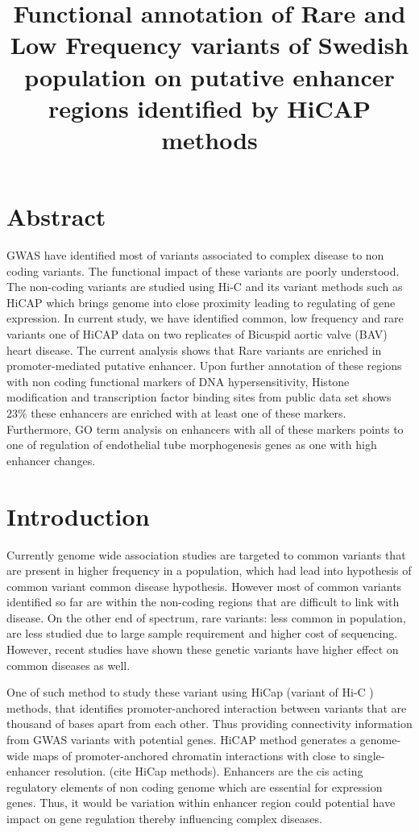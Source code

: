 \documentclass[11pt]{article} %
\title{Functional annotation of Rare and Low Frequency variants of Swedish population on putative enhancer regions identified by HiCAP methods}
\date{} %
\begin{document}
\maketitle


\section*{Abstract}

GWAS have identified most of variants associated to complex disease to non coding variants. The functional impact of these variants are poorly understood. The non-coding variants are studied using Hi-C and its variant methods such as HiCAP which brings genome into close proximity leading to regulating of gene expression. In current study, we have identified common, low frequency and rare variants one of HiCAP data on two replicates of Bicuspid aortic valve (BAV) heart disease. The current analysis shows that Rare variants are enriched in promoter-mediated putative enhancer. Upon further annotation of these regions with non coding functional markers of DNA hypersensitivity, Histone modification and transcription factor binding sites from public data set shows  $23\%$ these enhancers are enriched with at least one of these markers.  Furthermore, GO term analysis on enhancers with all of these markers points to one of regulation of endothelial tube morphogenesis genes as one with high enhancer changes.

\section{Introduction}
Currently genome wide association studies are targeted to common variants that are present in higher frequency in a population, which had lead into hypothesis of common variant common disease hypothesis. However most of common variants identified so far are within the non-coding regions that are difficult to link with disease. On the other end of spectrum, rare variants: less common in population, are less studied due to large sample requirement and higher cost of sequencing. However, recent studies have shown these genetic variants have higher effect on common diseases as well. 

One of such method to study these variant using HiCap (variant of Hi-C ) methods, that identifies promoter-anchored interaction between variants that are thousand of bases apart from each other. Thus providing connectivity information from GWAS variants with potential genes. HiCAP method generates a genome-wide maps of promoter-anchored chromatin interactions with close to single-enhancer resolution. (cite HiCap methods).  Enhancers are the cis acting regulatory elements of non coding genome which are essential for expression genes. Thus, it would be variation within enhancer region could potential have impact on gene regulation thereby influencing complex diseases.
\end{document}
